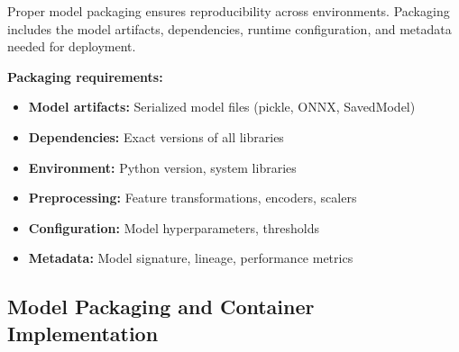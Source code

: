 Proper model packaging ensures reproducibility across environments. Packaging includes the model artifacts, dependencies, runtime configuration, and metadata needed for deployment.

\textbf{Packaging requirements:}
\begin{itemize}
    \item \textbf{Model artifacts:} Serialized model files (pickle, ONNX, SavedModel)
    \item \textbf{Dependencies:} Exact versions of all libraries
    \item \textbf{Environment:} Python version, system libraries
    \item \textbf{Preprocessing:} Feature transformations, encoders, scalers
    \item \textbf{Configuration:} Model hyperparameters, thresholds
    \item \textbf{Metadata:} Model signature, lineage, performance metrics
\end{itemize}

\subsection{Model Packaging and Container Implementation}

